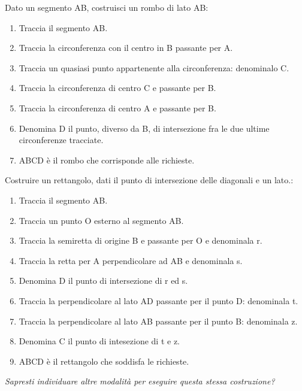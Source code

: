 \begin{procedura}
  Dato un segmento AB, costruisci un rombo di lato AB:
  \begin{enumerate} [nosep]
    \item 
    Traccia il segmento AB. 
    \item 
    Traccia la circonferenza con il centro in B passante per A.
    \item 
    Traccia un quasiasi punto appartenente alla circonferenza: denominalo C.
    \item 
    Traccia la circonferenza di centro C e passante per B.
    \item 
    Traccia la circonferenza di centro A e passante per B.
    \item 
    Denomina D il punto, diverso da B, di intersezione  fra le due ultime 
circonferenze tracciate.
    \item 
    ABCD è il rombo che corrisponde alle richieste.
  \end{enumerate}
\end{procedura}



\begin{procedura}
  Costruire un rettangolo, dati il punto di intersezione delle diagonali e un 
lato.:
  \begin{enumerate} [nosep]
    \item 
    Traccia il segmento AB.
    \item 
    Traccia un punto O esterno al segmento AB.
    \item 
    Traccia la semiretta di origine B e passante per O e denominala r.
    \item 
    Traccia la retta per A perpendicolare ad AB e denominala s.
    \item
    Denomina D il punto di intersezione di r ed s.
    \item
    Traccia la perpendicolare al lato AD passante per il punto D: denominala t.
    \item
    Traccia la perpendicolare al lato AB passante per il punto B: denominala z.
    \item
    Denomina C il punto di intesezione di t e z.
    \item 
    ABCD è il rettangolo che soddisfa le richieste.
  \end{enumerate}
  \textit{Sapresti individuare altre modalità per eseguire questa stessa 
costruzione? }
\end{procedura}

